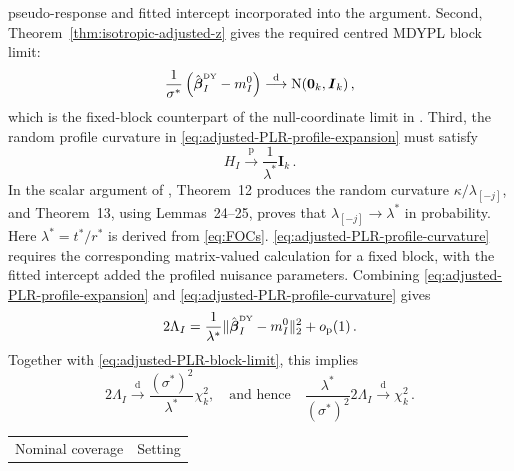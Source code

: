 \documentclass{article}
\makeatletter
\theoremstyle{definition}
\newcommand{\vnorm}[1]{%
	\ensuremath{%
		\if@display
		\left\| #1 \right\|
		\else
		\| #1 \|
		\fi
	}%
}
\newcommand*{\bb}{\boldsymbol}
\newcommand{\betady}{\ensuremath{\hat{\bbeta}^{\textrm{\tiny DY}}}}
\def\bbeta{\bb{\beta}}
\makeatother
\begin{document}
\begin{bibunit}
pseudo-response and fitted intercept incorporated into the argument.
Second, Theorem~\ref{thm:isotropic-adjusted-z} gives the required centred
MDYPL block limit:
\begin{equation}
\label{eq:adjusted-PLR-block-limit}
    \frac{1}{\sigma^*}
    \left(
        \betady_I-m_I^0
    \right)
    \overset{\mathrm d}{\longrightarrow}
    \mathrm N(\bb0_k,\bb I_k)
    \,,
\end{equation}
which is the fixed-block counterpart of the null-coordinate limit in
\citet[Theorem~5]{sur:2019}.
Third, the random profile curvature in
\eqref{eq:adjusted-PLR-profile-expansion} must satisfy
\begin{equation}
\label{eq:adjusted-PLR-profile-curvature}
    H_{I}
    \overset{\mathrm p}{\longrightarrow}
    \frac{1}{\lambda^*}\bb I_k
    \,.
\end{equation}
In the scalar argument of \citet{sur:2019}, Theorem~12 produces the random
curvature $\kappa/\lambda_{[-j]}$, and Theorem~13, using
Lemmas~24--25, proves that
$\lambda_{[-j]} \to \lambda^*$ in probability.
Here $\lambda^*=t^*/r^*$ is derived from \eqref{eq:FOCs}.
\eqref{eq:adjusted-PLR-profile-curvature} requires the
corresponding matrix-valued calculation for a fixed block, with the fitted
intercept added the profiled nuisance parameters.
Combining \eqref{eq:adjusted-PLR-profile-expansion} and
\eqref{eq:adjusted-PLR-profile-curvature} gives
\begin{equation}
\label{eq:adjusted-PLR-expansion}
    2\Lambda_I
    =
    \frac{1}{\lambda^*}
    \vnorm{
        \betady_I-m_I^0
    }_2^2
    +
    o_{\mathrm p}(1)
    \,.
\end{equation}
Together with \eqref{eq:adjusted-PLR-block-limit}, this implies
\begin{equation}
	\label{eq:plr-limits} 
	    2\Lambda_I
    \overset{\mathrm d}{\longrightarrow}
    \frac{(\sigma^*)^2}{\lambda^*}
    \chi_k^2
,
    \quad\textrm{and hence}\quad
    \frac{\lambda^*}{(\sigma^*)^2}
    2\Lambda_I
    \overset{\mathrm d}{\longrightarrow}
    \chi_k^2
    \,.
\end{equation}
\begin{table}[H]
\centering
\begin{tabular}{@{}lrrrrr@{}}
\toprule
Nominal coverage & \multicolumn{5}{c}{Setting} \\

\end{tabular}
\end{table}
\end{bibunit}
\end{document}

